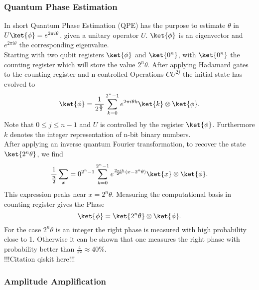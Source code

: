 \documentclass[../../main.tex]{subfiles}
\begin{document}
\subsubsection{Quantum Phase Estimation}\label{sec:QPE}
In short Quantum Phase Estimation (QPE) has the purpose to estimate $\theta$ in $U\ket{\phi} = e^{2 \pi i \theta }$, given a unitary operator $U$.
$\ket{\phi}$ is an eigenvector and $e^{2 \pi i \theta }$ the corresponding eigenvalue.\\
Starting with two qubit registers $\ket{\phi}$ and $\ket{0^n}$, with $\ket{0^n}$ the counting register
which will store the value $2^n \theta$. After applying Hadamard gates to the counting register and n controlled Operations $CU^{2j}$ the initial state has evolved to
\begin{equation}
  \ket{\phi} = \frac{1}{2^{\frac{n}{2}}} \sum_{k=0}^{2^n-1} e^{2 \pi i \theta k} \ket{k} \otimes \ket{\phi}.
\end{equation}
Note that $0 \le j \le n-1$ and $U$ is controlled by the register $\ket{\phi}$. Furthermore $k$ denotes the integer representation of n-bit binary numbers.\\
After applying  an inverse quantum Fourier transformation, to recover the state $\ket{2^n \theta}$, we find
\begin{equation}
  \frac{1}{\frac{n}{2}} \sum_x=0^{2^n-1} \sum_{k=0}^{2^n-1} e^{\frac{2 \pi i k}{2^n}(x - 2^n \theta)} \ket{x} \otimes \ket{\phi}.
\end{equation}
This expression peaks near $x=2^n \theta$. Measuring the computational basis in counting register gives the Phase
\begin{equation}
  \ket{\phi} = \ket{2^n \theta} \otimes \ket{\phi}.
\end{equation}
For the case $2^n \theta$ is an integer the right phase is measured with high probability close to 1. Otherwise it can be shown that one measures the right phase
with probability better than $\frac{4}{\pi^2} \approx 40 \% $.\\
!!!Citation qiskit here!!!
\subsubsection{Amplitude Amplification}\label{sec:amplitudeAmplification}
\end{document}
